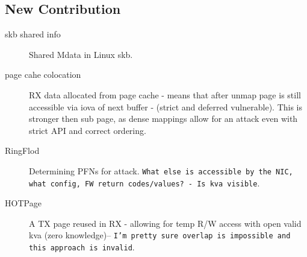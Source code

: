 \subsection{New Contribution}

\begin{description}
\item[skb shared info] Shared Mdata in Linux skb. 
\item[page cahe colocation] RX data allocated from page cache - means that after unmap page is still accessible via iova of next buffer - (strict and deferred vulnerable). This is stronger then sub page, as dense mappings 
allow for an attack even with strict API and correct ordering.
\item[RingFlod] Determining PFNs for attack. \texttt{What else is accessible by the NIC, what config, FW return codes/values? - Is kva visible}.
\item[HOTPage] A TX page reused in RX - allowing for temp R/W access with open valid kva (zero knowledge)-- \texttt{I'm pretty sure overlap is impossible and this approach is invalid}.
\end{description}